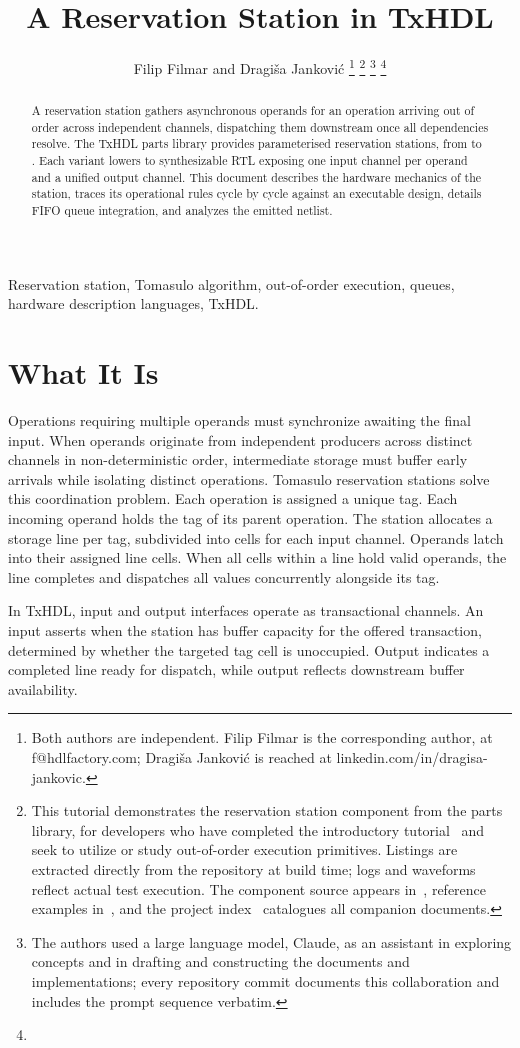 \documentclass[journal,9pt]{IEEEtran}
\title{A Reservation Station in TxHDL}
\author{Filip Filmar and Dragiša Janković%
\thanks{Both authors are independent. Filip Filmar is the
corresponding author, at f@hdlfactory.com; Dragiša Janković is
reached at linkedin.com/in/dragisa-jankovic.}%
\thanks{This tutorial demonstrates the reservation station component from the
parts library, for developers who have completed the introductory
tutorial~\cite{tutorial} and seek to utilize or study out-of-order execution
primitives. Listings are extracted directly from the repository \code{HDL/txhdl}
at build time; logs and waveforms reflect actual test execution. The component
source appears in~\cite{runtime}, reference examples in~\cite{examples}, and the
project index~\cite{cover} catalogues all companion documents.}%
\thanks{The authors used a large language model, Claude, as an
assistant in exploring concepts and in drafting and constructing
the documents and implementations; every repository commit documents
this collaboration and includes the prompt sequence verbatim.}%
\thanks{\buildstamp}}
\begin{document}
\maketitle

\begin{abstract}
A reservation station gathers asynchronous operands for an operation arriving
out of order across independent channels, dispatching them downstream once all
dependencies resolve. The TxHDL parts library provides parameterised
reservation stations, from  to . Each variant
lowers to synthesizable RTL exposing one input channel per operand and a unified
output channel. This document describes the hardware mechanics of the station,
traces its operational rules cycle by cycle against an executable design,
details FIFO queue integration, and analyzes the emitted netlist.
\end{abstract}

\begin{IEEEkeywords}
Reservation station, Tomasulo algorithm, out-of-order execution, queues,
hardware description languages, TxHDL.
\end{IEEEkeywords}

\section{What It Is}
\label{sec:s-what}

Operations requiring multiple operands must synchronize awaiting the final
input. When operands originate from independent producers across distinct
channels in non-deterministic order, intermediate storage must buffer early
arrivals while isolating distinct operations. Tomasulo reservation stations
solve this coordination problem. Each operation is assigned a unique tag. Each
incoming operand holds the tag of its parent operation. The station allocates a
storage line per tag, subdivided into cells for each input channel. Operands
latch into their assigned line cells. When all cells within a line hold valid
operands, the line completes and dispatches all values concurrently alongside
its tag.

In TxHDL, input and output interfaces operate as transactional channels. An
input asserts  when the station has buffer capacity for the offered
transaction, determined by whether the targeted tag cell is unoccupied. Output
 indicates a completed line ready for dispatch, while output
 reflects downstream buffer availability.
\end{document}
